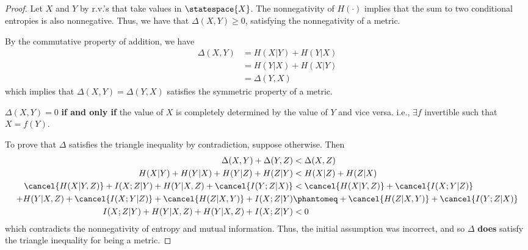 \documentclass[
  coursecode={MTHE 474},
  assignmentname={Homework \homeworknumber},
  studentnumber=20053722,
  name={Bryan Hoang}
]{
  ltxanswer%
}
\begin{document}
  \begin{questions}
    \setcounter{question}{\questionnumber}
    \addtocounter{question}{-1}
    \question{}
    \begin{solution}
      \begin{parts}
        \part{}
        \begin{proof}
          Let \(X\) and \(Y\) by r.v.'s that take values in \(\statespace{X}\). The nonnegativity of \(H(\cdot)\) implies that the sum to two conditional entropies is also nonnegative. Thus, we have that \(\boxed{\Delta(X,Y) \ge 0}\), satisfying the nonnegativity of a metric.

          By the commutative property of addition, we have
          \begin{align*}
            \Delta(X,Y) &= H(X|Y) + H(Y|X) \\
                        &= H(Y|X) + H(X|Y) \\
                        &= \Delta(Y,X)
          \end{align*}
          which implies that \(\boxed{\Delta(X,Y)=\Delta(Y,X)}\) satisfies the symmetric property of a metric.

          \(\Delta(X,Y) = 0\) \textbf{if and only if} the value of \(X\) is completely determined by the value of \(Y\) and vice versa. i.e., \(\exists f\) invertible such that \(X=f(Y)\).

          To prove that \(\Delta\) satisfies the triangle inequality by contradiction, suppose otherwise. Then
          \begin{align*}
            \Delta(X,Y) + \Delta(Y,Z)                                     &< \Delta(X,Z)                                      \\
            H(X|Y) + H(Y|X) + H(Y|Z) + H(Z|Y)                             &< H(X|Z) + H(Z|X)                                  \\
            \cancel{H(X|Y,Z)} + I(X;Z|Y) + H(Y|X,Z) + \cancel{I(Y;Z|X)}   &< \cancel{H(X|Y,Z)} + \cancel{I(X;Y|Z)}            \\
            + H(Y|X,Z) + \cancel{I(X;Y|Z)} + \cancel{H(Z|X,Y)} + I(X;Z|Y) &\phantomeq + \cancel{H(Z|X,Y)} + \cancel{I(Y;Z|X)} \\
            I(X;Z|Y) + H(Y|X,Z) + H(Y|X,Z) + I(X;Z|Y)                     &< 0
          \end{align*}
          which contradicts the nonnegativity of entropy and mutual information. Thus, the initial assumption was incorrect, and so \(\Delta\) \textbf{does} satisfy the triangle inequality for being a metric.
        \end{proof}


\end{parts}
\end{solution}
\end{questions}
\end{document}
